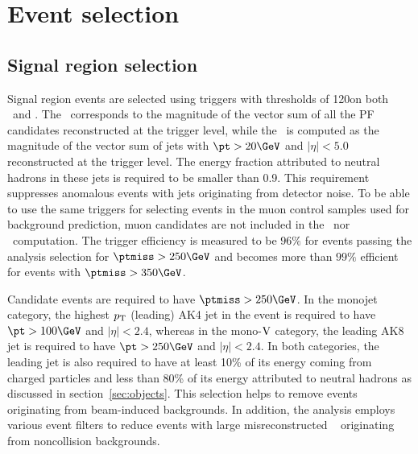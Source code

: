 \section{Event selection}
\label{sec:selection}

\subsection{Signal region selection}
\label{sec:selection_sr}
Signal region events are selected using triggers with thresholds of 120\GeV on both \ptmisstrig~and \mhttrig.
The \ptmisstrig~corresponds to the magnitude of the vector \ptvec sum of all the PF candidates reconstructed at the trigger level, while the \mhttrig~is computed as the magnitude of the vector \ptvec sum of jets with $\pt > 20\GeV$ and $|\eta| < 5.0$ reconstructed at the trigger level. The energy fraction attributed to neutral hadrons in these jets is required to be smaller than 0.9. This requirement suppresses anomalous events with jets originating from detector noise. To be able to use the same triggers for selecting events in the muon control samples used for background prediction, muon candidates are not included in the \ptmisstrig~nor \mhttrig~computation. The trigger efficiency is measured to be $96\%$ for events passing the analysis selection for $\ptmiss > 250\GeV$ and becomes more than $99\%$ efficient for events with $\ptmiss > 350\GeV$.

Candidate events are required to have $\ptmiss > 250\GeV$. In the monojet category, the highest $p_{\rm T}$ (leading) AK4 jet in the event is required to have $ \pt > 100\GeV$ and $|\eta| < 2.4$, whereas in the mono-$\mathrm{V}$ category, the leading AK8 jet is required to have $ \pt > 250\GeV$ and $|\eta| < 2.4$. In both categories, the leading jet is also required to have at least 10\% of its energy coming from charged particles and less than 80\% of its energy attributed to neutral hadrons as discussed in section~\ref{sec:objects}. This selection helps to remove events originating from beam-induced backgrounds. In addition, the analysis employs various event filters to reduce events with large misreconstructed \ptmiss~\cite{Sirunyan:2019kia} originating from noncollision backgrounds.

